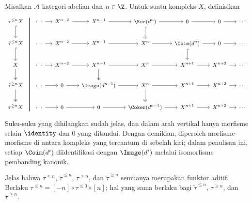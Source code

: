\begin{definisi}\label{def:truncation-cplx}
	Misalkan $\mathcal{A}$ kategori abelian dan $n \in \Z$. Untuk suatu
	kompleks $X$, definisikan
	\[\begin{tikzcd}
		[column sep=small, every cell/.append style = {font = \small}]
		\tau^{\leq n} X \arrow[phantom, r, "" {name=A, yshift=2ex}] \arrow[hookrightarrow, d] & \cdots \arrow[r] & X^{n-2} \arrow[r] & X^{n-1} \arrow[r] & \Ker(d^n) \arrow[r] \arrow[hookrightarrow, d] & 0 \arrow[r] & 0 \arrow[r] & \cdots \\
		\tilde{\tau}^{\leq n} X \arrow[hookrightarrow, d] & \cdots \arrow[r] & X^{n-2} \arrow[r] & X^{n-1} \arrow[r] & X^n \arrow[r] & \Coim(d^n) \arrow[r] \arrow[hookrightarrow, d] & 0 \arrow[r] & \cdots \\
		X \arrow[twoheadrightarrow, d] & \cdots \arrow[r] & X^{n-2} \arrow[r] & X^{n-1} \arrow[r] \arrow[twoheadrightarrow, d] & X^n \arrow[r] & X^{n+1} \arrow[r] & X^{n+2} \arrow[r] & \cdots \\
		\tilde{\tau}^{\geq n} X \arrow[twoheadrightarrow, d] & \cdots \arrow[r] & 0 \arrow[r] & \Image(d^{n-1}) \arrow[r] & X^n \arrow[r] \arrow[twoheadrightarrow, d] & X^{n+1} \arrow[r] & X^{n+2} \arrow[r] & \cdots \\
		\tau^{\geq n} X \arrow[phantom, r, "" {name=B, yshift=-2ex}] & \cdots \arrow[r] & 0 \arrow[r] & 0 \arrow[r] & \Coker(d^{n-1}) \arrow[r] & X^{n+1} \arrow[r] & X^{n+2} \arrow[r] & \cdots
		\arrow[dash, thick, from=A, to=B]
	\end{tikzcd}\]
	Suku-suku yang dihilangkan sudah jelas, dan dalam arah vertikal hanya
	morfisme selain $\identity$ dan $0$ yang ditandai. Dengan demikian,
	diperoleh morfisme-morfisme di antara kompleks yang tercantum di sebelah
	kiri; dalam penulisan ini, setiap $\Coim(d^i)$ diidentifikasi dengan
	$\Image(d^i)$ melalui isomorfisme pembanding kanonik.
\end{definisi}

Jelas bahwa $\tau^{\leq n}$, $\tilde{\tau}^{\leq n}$,
$\tau^{\geq n}$, dan $\tilde{\tau}^{\geq n}$ semuanya merupakan funktor
aditif. Berlaku
$\tau^{\leq n} = [-n] \circ \tau^{\leq 0} \circ [n]$; hal yang sama berlaku
bagi $\tilde{\tau}^{\leq n}$, $\tau^{\geq n}$, dan
$\tilde{\tau}^{\geq n}$.


